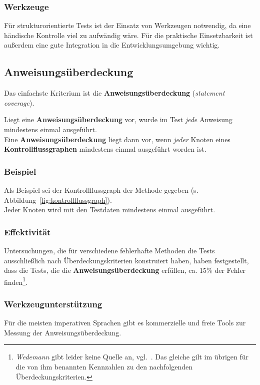 \subsubsection*{Werkzeuge}
Für strukturorientierte Tests ist der Einsatz von Werkzeugen notwendig, da eine händische Kontrolle viel zu aufwändig wäre.
Für die praktische Einsetzbarkeit ist außerdem eine gute Integration in die Entwicklungsumgebung wichtig.

\subsection{Anweisungsüberdeckung}
Das einfachste Kriterium ist die \textbf{Anweisungsüberdeckung} (\textit{statement coverage}).

\begin{tcolorbox}[title=Anweisungsüberdeckung]
    Liegt eine \textbf{Anweisungsüberdeckung} vor, wurde im Test \textit{jede} Anweisung mindestens einmal ausgeführt.\\
    Eine \textbf{Anweisungsüberdeckung} liegt dann vor, wenn \textit{jeder} Knoten eines \textbf{Kontrollflussgraphen} mindestens einmal ausgeführt worden ist.
\end{tcolorbox}

\subsubsection*{Beispiel}
Als Beispiel sei der Kontrollflussgraph der Methode  gegeben (s. Abbildung~\ref{fig:kontrollflussgraph}).\\
Jeder Knoten wird mit den Testdaten  mindestens einmal ausgeführt.

\subsubsection*{Effektivität}
Untersuchungen, die für verschiedene fehlerhafte Methoden die Tests ausschließlich nach Überdeckungskriterien konstruiert haben, haben festgestellt, dass die Tests, die die \textbf{Anweisungsüberdeckung} erfüllen, ca. 15\% der Fehler finden\footnote{
\textit{Wedemann} gibt leider keine Quelle an, vgl.~\cite[51]{Wed09c}. Das gleiche gilt im übrigen für die von ihm benannten Kennzahlen zu den nachfolgenden Überdeckungskriterien.
}.

\subsubsection*{Werkzeugunterstützung}
Für die meisten imperativen Sprachen gibt es kommerzielle und freie Tools zur Messung der Anweisungsüberdeckung.

